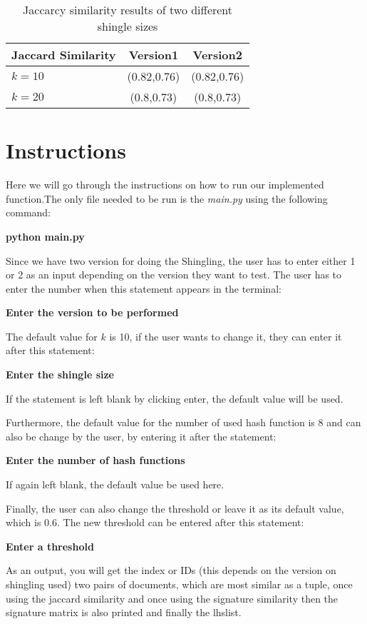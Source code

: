 \documentclass[a4paper, 11pt]{article}
\begin{document}
\begin{table}[H]
	\centering
	\begin{tabular}{|l|c|c|}
		\hline
		Jaccard Similarity & Version1 & Version2 \\\hline
		$k=10$ & (0.82,0.76) & (0.82,0.76) \\
		$k=20$ & (0.8,0.73) & (0.8,0.73)\\
		\hline
	\end{tabular}
	\caption{Jaccarcy similarity results of two different shingle sizes}
	\label{tab:results_k}
\end{table}


\section{Instructions}

Here we will go through the instructions on how to run our implemented function.The only file needed to be run is the \textit{main.py} using the following command: 

\textbf{python main.py}

Since we have two version for doing the Shingling, the user has to enter either 1 or 2 as an input depending on the version they want to test. The user has to enter the number when this statement appears in the terminal:

\textbf{Enter the version to be performed}

The default value for $k$ is 10, if the user wants to change it, they can enter it after this statement: 

\textbf{Enter the shingle size} 

If the statement is left blank by clicking enter, the default value will be used.

Furthermore, the default value for the number of used hash function is 8 and can also be change by the user, by entering it after the statement: 

\textbf{Enter the number of hash functions} 

If again left blank, the default value be used here.

Finally, the user can also change the threshold or leave it as its default value, which is 0.6. The new threshold can be entered after this statement: 

\textbf{Enter a threshold} 

As an output, you will get the index or IDs (this depends on the version on shingling used) two pairs of documents, which are most similar as a tuple, once using the jaccard similarity and once using the signature similarity then the signature matrix is also printed and finally the lhslist.
\end{document}
